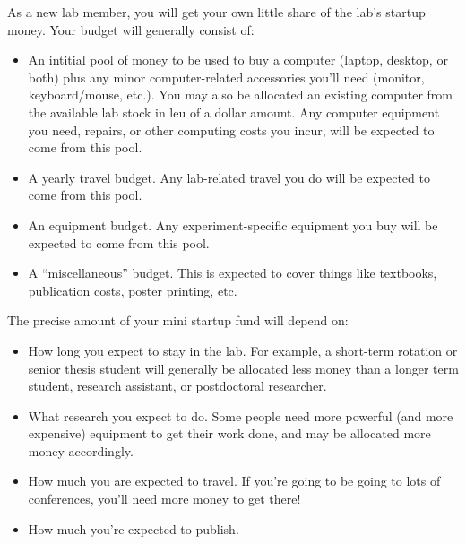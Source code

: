 \documentclass{tufte-book} %
\begin{document}
As a new lab member, you will get your own little share of the lab's
startup money.    Your budget will
generally consist of:
\begin{itemize}
\item An intitial pool of money to be used to buy a computer (laptop,
  desktop, or both) plus any minor computer-related accessories you'll
  need (monitor, keyboard/mouse, etc.).  You may also be allocated an
  existing computer from the available lab stock in leu of a dollar amount.  Any computer
  equipment you need, repairs, or other computing costs you incur,
  will be expected to come from this pool.
\item A yearly travel budget.  Any lab-related travel you do will be
  expected to come from this pool.
\item An equipment budget.  Any experiment-specific equipment you buy
  will be expected to come from this pool.
\item A ``miscellaneous'' budget.  This is expected to cover things
  like textbooks, publication costs, poster printing, etc.
\end{itemize}

The precise amount of your mini startup fund will depend on:
\begin{itemize}
\item How long you expect
to stay in the lab.  For example, a short-term rotation or senior thesis
student will generally be allocated less money than a longer term
student, research assistant, or postdoctoral researcher.
\item What research you expect to do.  Some people need more powerful
  (and more expensive) equipment to get their work done, and may be
  allocated more money accordingly.
\item How much you are expected to travel.  If you're going to be
  going to lots of conferences, you'll need more money to get there!
\item How much you're expected to publish.
\end{itemize}
\end{document}
